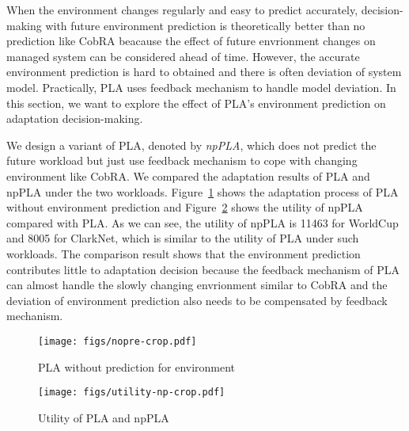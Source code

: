 \documentclass[sigconf]{acmart}
\begin{document}
	When the environment changes regularly and easy to predict accurately, decision-making with future environment prediction is theoretically better than no prediction like CobRA beacause the effect of future envrionment changes on managed system can be considered ahead of time. However, the accurate environment prediction is hard to obtained and there is often deviation of system model. Practically, PLA uses feedback mechanism to handle model deviation. In this section, we want to explore the effect of PLA's environment prediction on adaptation decision-making. 
	
	We design a variant of PLA, denoted by \textit{npPLA}, which does not predict the future workload but just use feedback mechanism to cope with changing environment like CobRA. We compared the adaptation results of PLA and npPLA under the two workloads. Figure~\ref{fig:nopre} shows the adaptation process of PLA without environment prediction and Figure~\ref{fig:utility-np} shows the utility of npPLA compared with PLA. As we can see, the utility of npPLA is 11463 for WorldCup and 8005 for ClarkNet, which is similar to the utility of PLA under such workloads. The comparison result shows that the environment prediction contributes little to adaptation decision because the feedback mechanism of PLA can almost handle the slowly changing envrionment similar to CobRA and the deviation of environment prediction also needs to be compensated by feedback mechanism. 
	
	\begin{figure}[!htp]
		\centering
		\texttt{[image: figs/nopre-crop.pdf]}
		\caption{PLA without prediction for environment}
		\label{fig:nopre}
	\end{figure}
	
	\begin{figure}[!htp]
		\centering
		\texttt{[image: figs/utility-np-crop.pdf]}
		\caption{Utility of PLA and npPLA}
		\label{fig:utility-np}
	\end{figure}
	
\end{document}
